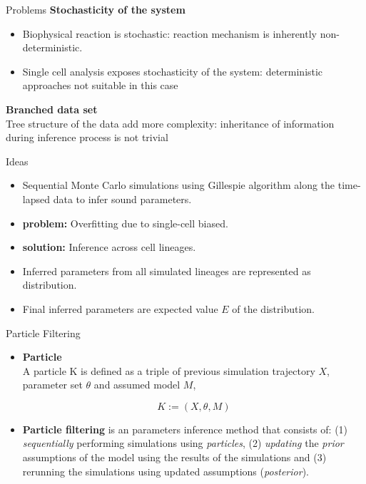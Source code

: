 \documentclass[pdf]
{beamer}
\begin{document}
\begin{frame}{Problems}
	\textbf{Stochasticity of the system}
	\begin{itemize}
	\item Biophysical reaction is stochastic: reaction mechanism is inherently non-deterministic.
	\item Single cell analysis exposes stochasticity of the system: deterministic approaches not suitable in this case
	\end{itemize}
	\textbf{Branched data set}\\
	Tree structure of the data add more complexity: inheritance of information during inference process is not trivial
\end{frame}

\begin{frame}{Ideas}
	\begin{itemize}
	\item Sequential Monte Carlo simulations using Gillespie algorithm along the time-lapsed data to infer sound parameters.
	\item<2-> \textbf{problem:} Overfitting due to single-cell biased.
	\item<3-> \textbf{solution:} Inference across cell lineages.
	\item<4-> Inferred parameters from all simulated lineages are represented as distribution.
	\item<5-> Final inferred parameters are expected value $E$ of the distribution.
	\end{itemize}
\end{frame}

\begin{frame}{Particle Filtering}

	\begin{itemize}

	\item \textbf{Particle}\\
	A particle K is defined as a triple of previous simulation trajectory $X$, parameter set $\theta$ and
assumed model $M$,

		\begin{equation}
		K := (X, \theta, M)
		\end{equation}
		
	\item \textbf{Particle filtering} is an parameters inference method that consists of: (1) \textit{sequentially} performing simulations using \textit{particles}, (2) \textit{updating} the \textit{prior} assumptions of the model using the results of the simulations and (3) rerunning the simulations using updated assumptions (\textit{posterior}).
	
	\end{itemize}

\end{frame}
\end{document}
